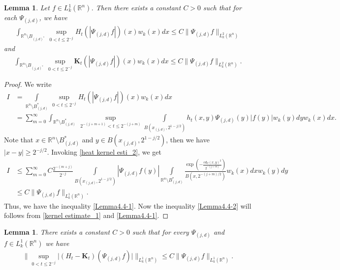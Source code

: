 \documentclass[11pt, reqno]{amsproc}
\newtheorem{lemma}[theorem]{Lemma}
\theoremstyle{definition}
\theoremstyle{remark}
\numberwithin{equation}{section}
\begin{document}
\begin{lemma} \label{lemma-4.1}
    Let $f\in L_k^1(\mathbb{R}^n)$. Then there exists a constant $C>0$ such that for each $\Psi_{(j,d)}$,  we have 
    \begin{align} \label{Lemma4.4-1}
        \int_{\mathbb{R}^n \setminus B_{(j,d)^*}} \,\sup\limits_{0<t\leq 2^{-j}} H_t(|\Psi_{(j,d)} f|)(x)w_k(x)dx \leq C \|\Psi_{(j,d)} f\|_{L_k^2(\mathbb{R}^n)}
    \end{align} and 
    \begin{align}\label{Lemma4.4-2}
        \int_{\mathbb{R}^n \setminus B_{(j,d)^*}} \,\sup\limits_{0<t\leq 2^{-j}} \mathbf{K}_t(|\Psi_{(j,d)} f|)(x)w_k(x)dx \leq C \|\Psi_{(j,d)} f\|_{L_k^2(\mathbb{R}^n)}.
    \end{align}
\end{lemma}
\begin{proof}
  We write 
  \begin{align*}
  I& = \int\limits_{\mathbb{R}^n \setminus B_{(j,d)}^*}  \,\sup\limits_{0<t\leq 2^{-j}} H_t(|\Psi_{(j,d)} f|)(x)w_k(x)dx \\ & = \sum_{m=0}^\infty  \int_{\mathbb{R}^n \setminus B_{(j,d)}^*}\,\sup\limits_{2^{-(j+m+1)}<t\leq 2^{-(j+m)}} \int\limits_{B(x_{(j,d)}, 2^{1-j/2})} h_t(x,y) \Psi_{(j,d)}(y) | f(y)| w_k(y)dyw_k(x)dx .
  \end{align*}  Note that $x\in \mathbb{R}^n \setminus B_{(j,d)}^* $ and $y\in B(x_{(j,d)}, 2^{1-j/2})$, then we have $|x-y|\geq 2^{-j/2}$. Invoking   \eqref{heat kernel esti_2}, we get 
  \begin{align*}
   I &\leq  \sum_{m=0}^\infty C \frac{2^{-(m+j)}}{2^{-j}} \int\limits_{B(x_{(j,d)}, 2^{1-j/2})}|\Psi_{(j,d)}f(y)| \int\limits_{\mathbb{R}^n \setminus B_{(j,d)}^*}  \frac{\exp\left( -\frac{cd_\mathcal{O}(x,y)^2}{2^{-(j+m)}} \right)}{B(x,2^{-(j+m)/2})} w_k(x)dx w_k(y)dy\\
   & \leq C\|\Psi_{(j,d)}f\|_{L_k^1(\mathbb{R}^n)}.
  \end{align*} Thus, we have the inequality \eqref{Lemma4.4-1}. Now the inequality \eqref{Lemma4.4-2} will follows from \eqref{kernel estimate_1} and \eqref{Lemma4.4-1}.
\end{proof}
\begin{lemma}\label{Lamma B2}
   There exists a constant $C>0$ such that for every $\Psi_{(j,d)}$ and $f\in L_k^1(\mathbb{R}^n)$ we have 
   \begin{align*}
       \Bigg\| \sup\limits_{0<t\leq2^{-j}} \big| (H_t-\mathbf{K}_t) (\Psi_{(j,d)}f)\big| \Bigg\|_{L_k^1(\mathbb{R}^n)} \leq C \|\Psi_{(j,d)}f\|_{L_k^1(\mathbb{R}^n)}.
   \end{align*}
\end{lemma}
\end{document}

